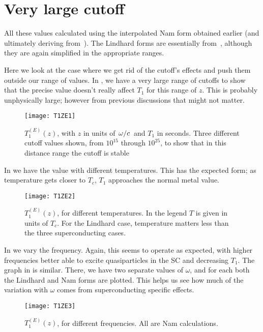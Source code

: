\documentclass[11pt]{article}
\begin{document}
	\graphicspath{{figures/}}

	\section{Very large cutoff} \label{sec:intro}

	All these values calculated using the interpolated Nam form obtained earlier (and ultimately deriving from~\cite{Nam1967}).
	The Lindhard forms are essentially from~\cite{SolyomV3}, although they are again simplified in the appropriate ranges.

	Here we look at the case where we get rid of the cutoff's effects and push them outside our range of values.
	In , we have a very large range of cutoffs to show that the precise value doesn't really affect $T_1$ for this range of $z$.
	This is probably unphysically large;
	however from previous discussions that might not matter.

	\begin{figure}[htp]
		\centering
		\texttt{[image: T1ZE1]}
		\caption{$T_{1}^{(E)}(z)$, with $z$ in units of $\flatfrac{\omega}{c}$ and $T_1$ in seconds.
		Three different cutoff values shown, from $10^{15}$ through $10^{25}$, to show that in this distance range the cutoff is stable}\label{fig:t1ez}
	\end{figure}

	In  we have the value with different temperatures.
	This has the expected form;
	as temperature gets closer to $T_c$, $T_1$ approaches the normal metal value.

	\begin{figure}[htp]
		\centering
		\texttt{[image: T1ZE2]}
		\caption{$T_{1}^{(E)}(z)$, for different temperatures.
			In the legend $T$ is given in units of $T_c$.
			For the Lindhard case, temperature matters less than the three superconducting cases.
		} \label{fig:t2ez}
	\end{figure}

	In  we vary the frequency.
	Again, this seems to operate as expected, with higher frequencies better able to excite quasiparticles in the SC and decreasing $T_1$.
	The graph in  is similar.
	There, we have two separate values of $\omega$, and for each both the Lindhard and Nam forms are plotted.
	This helps us see how much of the variation with $\omega$ comes from superconducting specific effects.

	\begin{figure}[htp]
		\centering
		\texttt{[image: T1ZE3]}
		\caption{
			$T_{1}^{(E)}(z)$, for different frequencies.
			All are Nam calculations.
		} \label{fig:t3ez}
	\end{figure}
\end{document}
